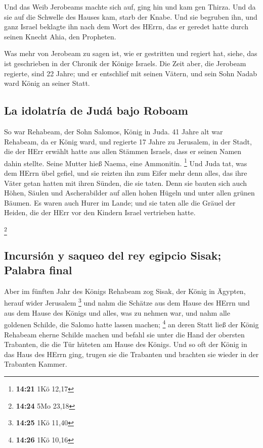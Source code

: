  Und das Weib Jerobeams machte sich auf, ging hin und kam
gen Thirza. Und da sie auf die Schwelle des Hauses kam, starb der Knabe.
 Und sie begruben ihn, und ganz Israel beklagte ihn nach
dem Wort des HErrn, das er geredet hatte durch seinen Knecht Ahia, den
Propheten.

 Was mehr von Jerobeam zu sagen ist, wie er gestritten
und regiert hat, siehe, das ist geschrieben in der Chronik der Könige
Israels.  Die Zeit aber, die Jerobeam regierte, sind 22
Jahre; und er entschlief mit seinen Vätern, und sein Sohn Nadab ward
König an seiner Statt.

\hypertarget{la-idolatruxeda-de-juduxe1-bajo-roboam}{%
\subsection{La idolatría de Judá bajo
Roboam}\label{la-idolatruxeda-de-juduxe1-bajo-roboam}}

 So war Rehabeam, der Sohn Salomos, König in Juda. 41
Jahre alt war Rehabeam, da er König ward, und regierte 17 Jahre zu
Jerusalem, in der Stadt, die der HErr erwählt hatte aus allen Stämmen
Israels, dass er seinen Namen dahin stellte. Seine Mutter hieß Naema,
eine Ammonitin. \footnote{\textbf{14:21} 1Kö 12,17}  Und
Juda tat, was dem HErrn übel gefiel, und sie reizten ihn zum Eifer mehr
denn alles, das ihre Väter getan hatten mit ihren Sünden, die sie taten.
 Denn sie bauten sich auch Höhen, Säulen und
Ascherabilder auf allen hohen Hügeln und unter allen grünen Bäumen.
 Es waren auch Hurer im Lande; und sie taten alle die
Gräuel der Heiden, die der HErr vor den Kindern Israel vertrieben hatte.

\footnote{\textbf{14:24} 5Mo 23,18}

\hypertarget{incursiuxf3n-y-saqueo-del-rey-egipcio-sisak-palabra-final}{%
\subsection{Incursión y saqueo del rey egipcio Sisak; Palabra
final}\label{incursiuxf3n-y-saqueo-del-rey-egipcio-sisak-palabra-final}}

 Aber im fünften Jahr des Königs Rehabeam zog Sisak, der
König in Ägypten, herauf wider Jerusalem \footnote{\textbf{14:25} 1Kö
  11,40}  und nahm die Schätze aus dem Hause des HErrn
und aus dem Hause des Königs und alles, was zu nehmen war, und nahm alle
goldenen Schilde, die Salomo hatte lassen machen; \footnote{\textbf{14:26}
  1Kö 10,16}  an deren Statt ließ der König Rehabeam
eherne Schilde machen und befahl sie unter die Hand der obersten
Trabanten, die die Tür hüteten am Hause des Königs.  Und
so oft der König in das Haus des HErrn ging, trugen sie die Trabanten
und brachten sie wieder in der Trabanten Kammer.

